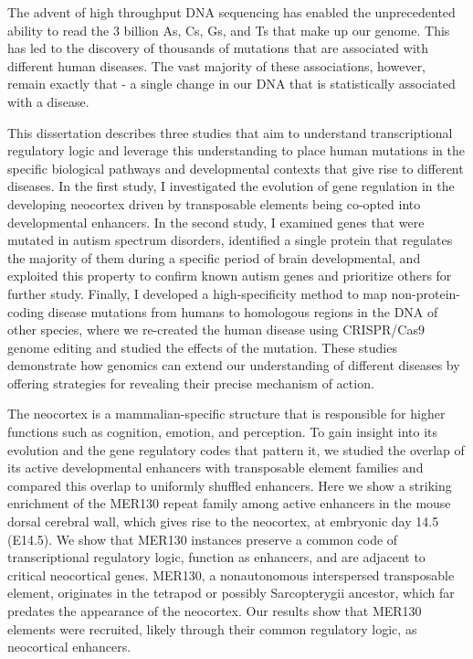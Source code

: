 The advent of high throughput DNA sequencing has enabled the unprecedented  ability to read the 3 billion As, Cs, Gs, and Ts that make up our genome. This has led to the discovery of thousands of mutations that are  associated with different human diseases. The vast majority of these associations, however, remain exactly that - a single change in our DNA that is statistically associated with a disease. 
%

This dissertation describes three studies that aim to understand transcriptional regulatory logic and leverage this understanding to place human mutations in the specific  biological pathways and developmental contexts that give rise to different diseases. In the first study, I investigated the evolution of gene regulation in the developing neocortex driven by transposable elements being co-opted into developmental enhancers. In the second study, I examined genes that were mutated in autism spectrum disorders, identified a single protein that regulates the majority of them during a specific period of brain developmental, and exploited this property to confirm known autism genes and prioritize others for further study. Finally, I developed a high-specificity method to map non-protein-coding disease mutations from humans to homologous regions in the DNA of other species, where we re-created the human disease using CRISPR/Cas9 genome editing and studied the effects of the mutation. These studies demonstrate how genomics can extend our understanding of different diseases by offering strategies for revealing their precise mechanism of action.
%

The neocortex is a mammalian-specific structure that is responsible for higher functions such as cognition, emotion, and perception. To gain insight into its evolution and the gene regulatory codes that pattern it, we studied the overlap of its active developmental enhancers with transposable element families and compared this overlap to uniformly shuffled enhancers. Here we show a striking enrichment of the MER130 repeat family among active enhancers in the mouse dorsal cerebral wall, which gives rise to the neocortex, at embryonic day 14.5 (E14.5). We show that MER130 instances preserve a common code of transcriptional regulatory logic, function as enhancers, and are adjacent to critical neocortical genes. MER130, a nonautonomous interspersed transposable element, originates in the tetrapod or possibly Sarcopterygii ancestor, which far predates the appearance of the neocortex. Our results show that MER130 elements were recruited, likely through their common regulatory logic, as neocortical enhancers.
%

